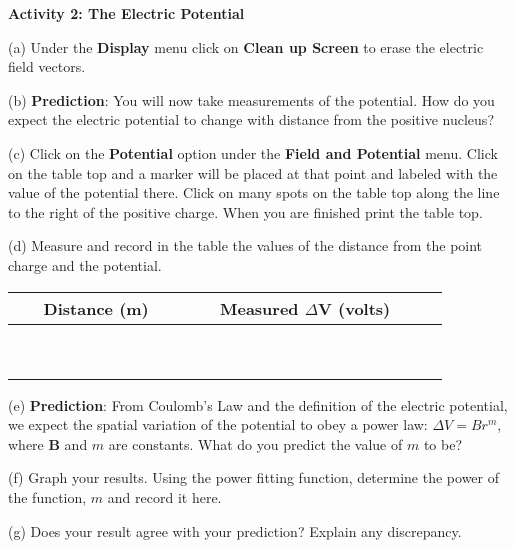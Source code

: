 \textbf{Activity 2: The Electric Potential}

(a) Under the {\bf Display} menu click on {\bf Clean up Screen} to erase the
electric field vectors.

(b) \textbf{Prediction}: You will now take measurements of the potential.
How do you expect the electric potential to change with distance from the positive nucleus?
\vspace{15mm}
 
(c) Click on the \textbf{Potential} option under the \textbf{Field and Potential}
menu. Click on the table top and a marker will be
placed at that point and labeled with the value of the potential there.
Click on many spots on the table top along the line to the right of the
positive charge.
When you are finished print the table top.
\vspace{15mm}

(d) Measure and record in the table the values of the distance from the
point charge and the potential.

\vspace{0.3cm}
{\centering \begin{tabular}{|c|c|c|}
\hline 
~~~Distance (m)~~~&
~~~Measured \( \Delta  \)V (volts)~~~\\
\hline
\hline 
&
\\
\hline 
&
\\
\hline 
&
\\
\hline 
&
\\
\hline 
&
\\
\hline 
&
\\
\hline 
&
\\
\hline 
&
\\
\hline 
&
\\
\hline
\end{tabular}\par}
\vspace{0.3cm}


(e) \textbf{Prediction}: From Coulomb's Law and the definition of the
electric potential, we expect the spatial variation of the potential
to obey a power law: \( \Delta V=Br^{m} \), where \( \mathbf{B} \)
and \( m \) are constants. What do you predict the value of \textbf{\( m \)}
to be?\vspace{15mm}


(f) Graph your results. Using the power fitting
function, determine the power of the function, $m$ and record it here.
\vspace{15mm}

(g) Does your result agree with your prediction? Explain any discrepancy.\vspace{15mm}


